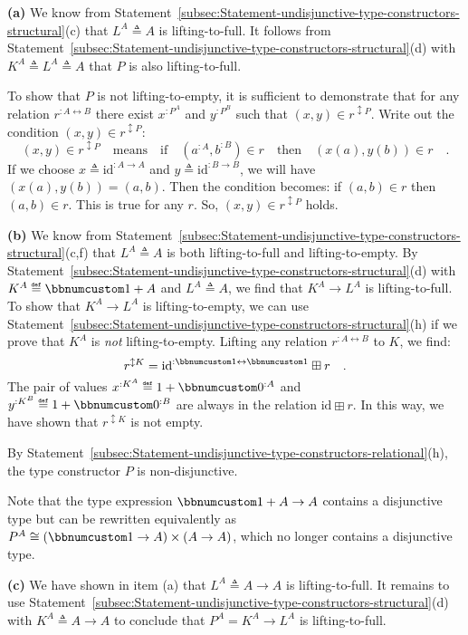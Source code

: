 \textbf{(a)} We know from Statement~\ref{subsec:Statement-undisjunctive-type-constructors-structural}(c)
that $L^{A}\triangleq A$ is lifting-to-full. It follows from Statement~\ref{subsec:Statement-undisjunctive-type-constructors-structural}(d)
with $K^{A}\triangleq L^{A}\triangleq A$ that $P$ is also lifting-to-full.

To show that $P$ is not lifting-to-empty, it is sufficient to demonstrate
that for any relation $r^{:A\leftrightarrow B}$ there exist $x^{:P^{A}}$
and $y^{:P^{B}}$ such that $(x,y)\in r^{\updownarrow P}$. Write
out the condition $(x,y)\in r^{\updownarrow P}$:
\[
(x,y)\in r^{\updownarrow P}\quad\text{means}\quad\text{if}\quad(a^{:A},b^{:B})\in r\quad\text{then}\quad(x(a),y(b))\in r\quad.
\]
If we choose $x\triangleq\text{id}^{:A\rightarrow A}$ and $y\triangleq\text{id}^{:B\rightarrow B}$,
we will have $(x(a),y(b))=(a,b)$. Then the condition becomes: if
$(a,b)\in r$ then $(a,b)\in r$. This is true for any $r$. So, $(x,y)\in r^{\updownarrow P}$
holds.

\textbf{(b)} We know from Statement~\ref{subsec:Statement-undisjunctive-type-constructors-structural}(c,f)
that $L^{A}\triangleq A$ is both lifting-to-full and lifting-to-empty.
By Statement~\ref{subsec:Statement-undisjunctive-type-constructors-structural}(d)
with $K^{A}\triangleq\bbnum 1+A$ and $L^{A}\triangleq A$, we find
that $K^{A}\rightarrow L^{A}$ is lifting-to-full. To show that $K^{A}\rightarrow L^{A}$
is lifting-to-empty, we can use Statement~\ref{subsec:Statement-undisjunctive-type-constructors-structural}(h)
if we prove that $K^{A}$ is \emph{not} lifting-to-empty. Lifting
any relation $r^{:A\leftrightarrow B}$ to $K$, we find:
\[
r^{\updownarrow K}=\text{id}^{:\bbnum 1\leftrightarrow\bbnum 1}\boxplus r\quad.
\]
The pair of values $x^{:K^{A}}\triangleq1+\bbnum 0^{:A}$ and $y^{:K^{B}}\triangleq1+\bbnum 0^{:B}$
are always in the relation $\text{id}\boxplus r$. In this way, we
have shown that $r^{\updownarrow K}$ is not empty. 

By Statement~\ref{subsec:Statement-undisjunctive-type-constructors-relational}(h),
the type constructor $P$ is non-disjunctive. 

Note that the type expression $\bbnum 1+A\rightarrow A$ contains
a disjunctive type but can be rewritten equivalently as $P^{A}\cong(\bbnum 1\rightarrow A)\times(A\rightarrow A)$,
which no longer contains a disjunctive type.

\textbf{(c)} We have shown in item (a) that $L^{A}\triangleq A\rightarrow A$
is lifting-to-full. It remains to use Statement~\ref{subsec:Statement-undisjunctive-type-constructors-structural}(d)
with $K^{A}\triangleq A\rightarrow A$ to conclude that $P^{A}=K^{A}\rightarrow L^{A}$
is lifting-to-full.

